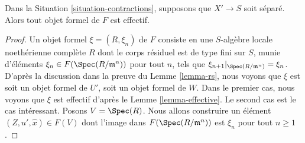 \begin{lemma}
\label{lemma-formal-object-effective}
Dans la Situation \ref{situation-contractions}, supposons que $X' \to S$ soit séparé.
Alors tout objet formel de $F$ est effectif.
\end{lemma}

\begin{proof}
Un objet formel $\xi = (R, \xi_n)$ de $F$ consiste en une
$S$-algèbre locale noethérienne complète $R$ dont le corps résiduel est de type fini
sur $S$, munie d'éléments $\xi_n \in F(\Spec(R/\mathfrak m^n))$
pour tout $n$, tels que $\xi_{n + 1}|_{\Spec(R/\mathfrak m^n)} = \xi_n$.
D'après la discussion dans la preuve du Lemme \ref{lemma-rs},
nous voyons que $\xi$ est soit un objet formel de $U'$, soit un objet
formel de $W$. Dans le premier cas, nous voyons que $\xi$ est effectif
d'après le Lemme \ref{lemma-effective}. Le second cas est le cas intéressant.
Posons $V = \Spec(R)$. Nous allons construire un élément
$(Z, u', \hat x) \in F(V)$ dont l'image dans $F(\Spec(R/\mathfrak m^n))$
est $\xi_n$ pour tout $n \geq 1$.


\end{proof}
